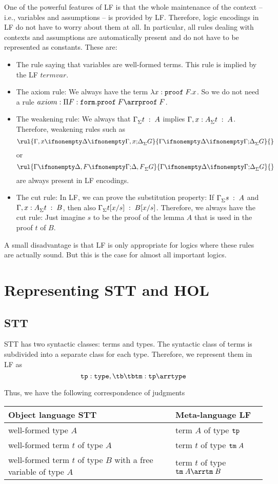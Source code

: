 One of the powerful features of LF is that the whole maintenance of the context -- i.e., variables and assumptions -- is provided by LF. Therefore, logic encodings in LF do not have to worry about them at all. In particular, all rules dealing with contexts and assumptions are automatically present and do not have to be represented as constants. These are:
\begin{itemize}
  \item The rule saying that variables are well-formed terms. This rule is implied by the LF $termvar$.
	\item The axiom rule: We always have the term $\lambda x:\mathtt{proof}\;F.x$. So we do not need a rule $axiom:\P{F}{\FORM}\PROOF\;F\arr\PROOF\;F$.
	\item The weakening rule: We always that $\Gamma^{}_{\Sigma}t\;:\;A$ implies $\Gamma,x:A^{}_{\Sigma}t\;:\;A$. Therefore, weakening rules such as
	\[\rul{\iscons{\Sigma}{\Gamma,x}{\Delta}{G}}{\iscons{\Sigma}{\Gamma}{\Delta}{G}}{}\]
	or
	\[\rul{\iscons{\Sigma}{\Gamma}{\Delta,F}{G}}{\iscons{\Sigma}{\Gamma}{\Delta}{G}}{}\]
	are always present in LF encodings.
	\item The cut rule: In LF, we can prove the substitution property: If $\Gamma^{}_{\Sigma}s\;:\;A$ and $\Gamma,x:A^{}_{\Sigma}t\;:\;B$, then also $\Gamma^{}_{\Sigma}t[x/s]\;:\;B[x/s]$. Therefore, we always have the cut rule: Just imagine $s$ to be the proof of the lemma $A$ that is used in the proof $t$ of $B$.
\end{itemize}

A small disadvantage is that LF is only appropriate for logics where these rules are actually sound. But this is the case for almost all important logics.

\section{Representing STT and HOL}

\subsection{STT}

STT has two syntactic classes: terms and types. The syntactic class of terms is subdivided into a separate class for each type. Therefore, we represent them in LF as
\[\Type:\TYPE,\tb\tb\Term:\Type\arr\TYPE\]

Thus, we have the following correspondence of judgments
\begin{center}
\begin{tabular}{|l|l|}
\hline
Object language STT & Meta-language LF \\
\hline
well-formed type $A$ & term $A$ of type $\mathtt{tp}$ \\
well-formed term $t$ of type $A$ & term $t$ of type $\mathtt{tm}\;A$ \\
well-formed term $t$ of type $B$ with a free variable of type $A$ & term $t$ of type $\Term\;A\arr\Term\;B$ \\
\hline
\end{tabular}
\end{center}

